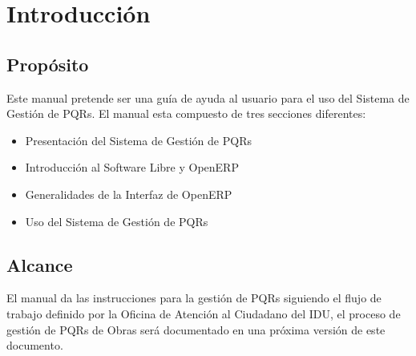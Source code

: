 \section{Introducción}
\subsection{Propósito}
Este manual pretende ser una guía de ayuda al usuario para el uso del Sistema de Gestión de PQRs. El manual esta compuesto de tres secciones diferentes:
\begin{itemize}
 \item Presentación del Sistema de Gestión de PQRs
 \item Introducción al Software Libre y OpenERP
 \item Generalidades de la Interfaz de OpenERP
 \item Uso del Sistema de Gestión de PQRs
\end{itemize}

\subsection{Alcance}
El manual da las instrucciones para la gestión de PQRs siguiendo el flujo de trabajo definido por la Oficina de Atención al Ciudadano del IDU, el proceso de gestión de PQRs de Obras será documentado en una próxima versión de este documento. 
